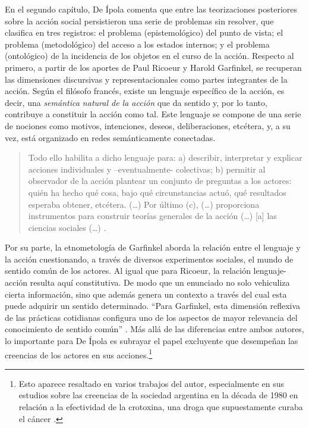 En el segundo capítulo, De Ípola comenta que entre las teorizaciones posteriores sobre la acción social persistieron una serie de problemas sin resolver, que clasifica en tres registros: el problema (epistemológico) del punto de vista; el problema (metodológico) del acceso a los estados internos; y el problema (ontológico) de la incidencia de los objetos en el curso de la acción. Respecto al primero, a partir de los aportes de Paul Ricoeur y Harold Garfinkel, se recuperan las dimensiones discursivas y representacionales como partes integrantes de la acción. Según el filósofo francés, existe un lenguaje específico de la acción, es decir, una \emph{semántica natural de la acción} que da sentido y, por lo tanto, contribuye a constituir la acción como tal. Este lenguaje se compone de una serie de nociones como motivos, intenciones, deseos, deliberaciones, etcétera, y, a su vez, está organizado en redes semánticamente conectadas.

\begin{quote}
Todo ello habilita a dicho lenguaje para: a) describir, interpretar y explicar acciones individuales y --eventualmente- colectivas; b) permitir al observador de la acción plantear un conjunto de preguntas a los actores: quién ha hecho qué cosa, bajo qué circunstancias actuó, qué resultados esperaba obtener, etcétera. (\dots) Por último (c), (\dots) proporciona instrumentos para construir teorías generales de la acción (\dots) [a] las ciencias sociales (\dots) \parencite[53]{1600-DEIPOLA2001}.
\end{quote}

Por su parte, la etnometología de Garfinkel aborda la relación entre el lenguaje y la acción cuestionando, a través de diversos experimentos sociales, el mundo de sentido común de los actores. Al igual que para Ricoeur, la relación lenguaje-acción resulta aquí constitutiva. De modo que un enunciado no solo vehiculiza cierta información, sino que además genera un contexto a través del cual esta puede adquirir un sentido determinado. \enquote{Para Garfinkel, esta dimensión reflexiva de las prácticas cotidianas configura uno de los aspectos de mayor relevancia del conocimiento de sentido común} \parencite[41]{1600-DEIPOLA2001}. Más allá de las diferencias entre ambos autores, lo importante para De Ípola es subrayar el papel excluyente que desempeñan las creencias de los actores en sus acciones.\footnote{Esto aparece resaltado en varios trabajos del autor, especialmente en sus estudios sobre las creencias de la sociedad argentina en la década de 1980 en relación a la efectividad de la crotoxina, una droga que supuestamente curaba el cáncer \parencite{1592-DEIPOLA1997,1610-DEIPOLA2002}.}

